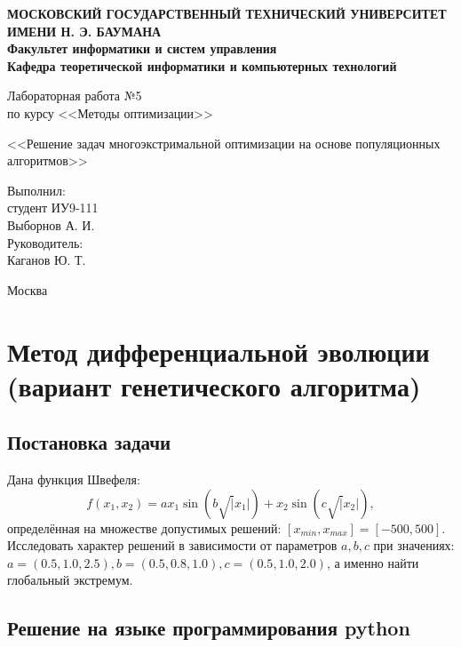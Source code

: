\documentclass[12pt,a4paper,oneside]{extarticle}
\begin{document}
\pgfplotsset{compat=1.8}

\thispagestyle{empty}
\newpage
{
\centering


\textbf{
МОСКОВСКИЙ ГОСУДАРСТВЕННЫЙ ТЕХНИЧЕСКИЙ УНИВЕРСИТЕТ ИМЕНИ Н. Э. БАУМАНА \\
Факультет информатики и систем управления \\
Кафедра теоретической информатики и компьютерных технологий}
\bigskip
\bigskip
\bigskip
\bigskip
\bigskip
\bigskip
\bigskip

\vfill


Лабораторная работа №5 \\
по курсу <<Методы оптимизации>>

\bigskip

{\large <<Решение задач многоэкстримальной оптимизации на основе популяционных алгоритмов>>}
\bigskip

\vfill



\hfill\parbox{4cm} {
Выполнил:\\
студент ИУ9-111 \hfill \\
Выборнов А. И.\hfill \medskip\\
Руководитель:\\
Каганов Ю. Т.\hfill
}


\vspace{\fill}

Москва \number\year
\clearpage
}



\clearpage

\section{Метод дифференциальной эволюции (вариант генетического алгоритма)}
    \subsection{Постановка задачи}
        Дана функция Швефеля:
        $$f(x_1, x_2) = ax_1 \sin(b\sqrt|x_1|) + x_2 \sin(c\sqrt|x_2|),$$ 
        определённая на множестве допустимых решений: $[x_{min}, x_{max}] = [-500,500]$.
        Исследовать характер решений в зависимости от параметров $a,b,c$ при значениях: 
        $a = (0.5, 1.0, 2.5), b = (0.5, 0.8, 1.0), c = (0.5, 1.0, 2.0)$, а именно найти глобальный экстремум.
        

    \subsection{Решение на языке программирования python}
        
\end{document}
